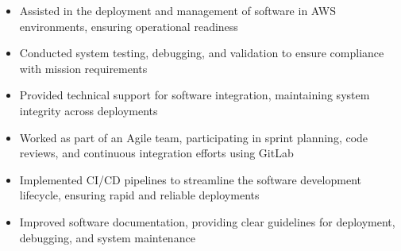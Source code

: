 \par\smallskip
\noindent
\begin{minipage}{20cm}
  \begin{minipage}{9.75cm}
    \begin{itemize}
      \item Assisted in the deployment and management of software in AWS environments, ensuring operational readiness
      \item Conducted system testing, debugging, and validation to ensure compliance with mission requirements
      \item Provided technical support for software integration, maintaining system integrity across deployments
    \end{itemize}
  \end{minipage}
  \hfill
  \begin{minipage}{9.75cm}
    \begin{itemize}
      \item Worked as part of an Agile team, participating in sprint planning, code reviews, and continuous integration efforts using GitLab
      \item Implemented CI/CD pipelines to streamline the software development lifecycle, ensuring rapid and reliable deployments
      \item Improved software documentation, providing clear guidelines for deployment, debugging, and system maintenance
    \end{itemize}
  \end{minipage}
\end{minipage}
\par\smallskip
\divider


